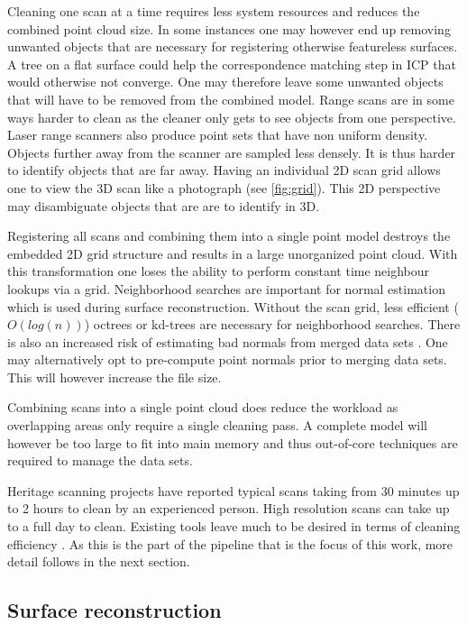 Cleaning one scan at a time requires less system resources and reduces the combined point cloud size. In some instances one may however end up removing unwanted objects that are necessary for registering otherwise featureless surfaces. A tree on a flat surface could help the correspondence matching step in ICP that would otherwise not converge. One may therefore leave some unwanted objects that will have to be removed from the combined model. Range scans are in some ways harder to clean as the cleaner only gets to see objects from one perspective. Laser range scanners also produce point sets that have non uniform density. Objects further away from the scanner are sampled less densely. It is thus harder to identify objects that are far away. Having an individual 2D scan grid allows one to view the 3D scan like a photograph (see \autoref{fig:grid}). This 2D perspective may disambiguate objects that are are to identify in 3D. 

Registering all scans and combining them into a single point model destroys the embedded 2D grid structure and results in a large unorganized point cloud. With this transformation one loses the ability to perform constant time neighbour lookups via a grid. Neighborhood searches are important for normal estimation which is used during surface reconstruction. Without the scan grid, less efficient ($O(log(n))$) octrees or kd-trees are necessary for neighborhood searches. There is also an increased risk of estimating bad normals from merged data sets \cite{Ruther2011}. One may alternatively opt to pre-compute point normals prior to merging data sets. This will however increase the file size.

Combining scans into a single point cloud does reduce the workload as overlapping areas only require a single cleaning pass. A complete model will however be too large to fit into main memory and thus out-of-core techniques are required to manage the data sets.

Heritage scanning projects have reported typical scans taking from 30 minutes up to 2 hours to clean by an experienced person. High resolution scans can take up to a full day to clean. Existing tools leave much to be desired in terms of cleaning efficiency \cite{Ruther2011}. As this is the part of the pipeline that is the focus of this work, more detail follows in the next section.


\subsection{Surface reconstruction}  \label{sec:reconstruction}

